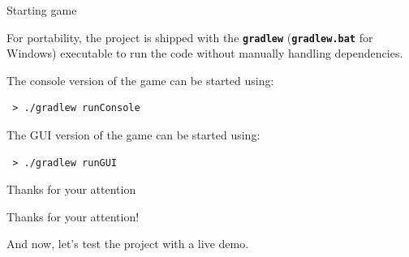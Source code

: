 \documentclass{beamer}
\begin{document}
  \begin{frame}[fragile]{Starting game}

    For portability, the project is shipped with the \texttt{\textbf{gradlew}} (\texttt{\textbf{gradlew.bat}} for Windows) executable to run the code without manually handling dependencies.

    \vspace{2em}

    The console version of the game can be started using:

    \begin{lstlisting}
 > ./gradlew runConsole
    \end{lstlisting}

    \vspace{1em}

    \pause

    The GUI version of the game can be started using:

    \begin{lstlisting} 
 > ./gradlew runGUI
    \end{lstlisting}

  \end{frame}


  \begin{frame} {Thanks for your attention}

    Thanks for your attention!

    \vspace{2em}

    And now, let's test the project with a live demo.


  \end{frame}
\end{document}
